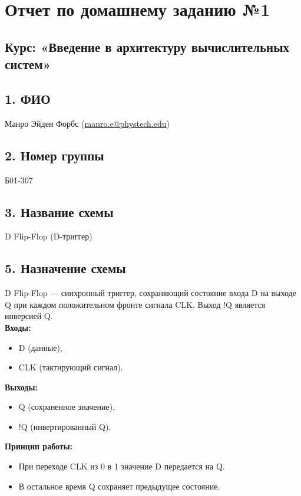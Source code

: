 \documentclass[a4paper,12pt]{article}
\begin{document}
\section*{Отчет по домашнему заданию №1}
\subsection*{Курс: «Введение в архитектуру вычислительных систем»}

\subsection*{1. ФИО}
Манро Эйден Форбс (\href{mailto:manro.e@phystech.edu}{manro.e@phystech.edu})

\subsection*{2. Номер группы}
Б01-307

\subsection*{3. Название схемы}
D Flip-Flop (D-триггер)

\subsection*{5. Назначение схемы}
D Flip-Flop — синхронный триггер, сохраняющий состояние входа D на выходе Q при каждом положительном фронте сигнала CLK. Выход !Q является инверсией Q. \\

\textbf{Входы:}
\begin{itemize}
    \item D (данные),
    \item CLK (тактирующий сигнал).
\end{itemize}

\textbf{Выходы:}
\begin{itemize}
    \item Q (сохраненное значение),
    \item !Q (инвертированный Q).
\end{itemize}

\textbf{Принцип работы:}
\begin{itemize}
    \item При переходе CLK из 0 в 1 значение D передается на Q.
    \item В остальное время Q сохраняет предыдущее состояние.
\end{itemize}
\end{document}
